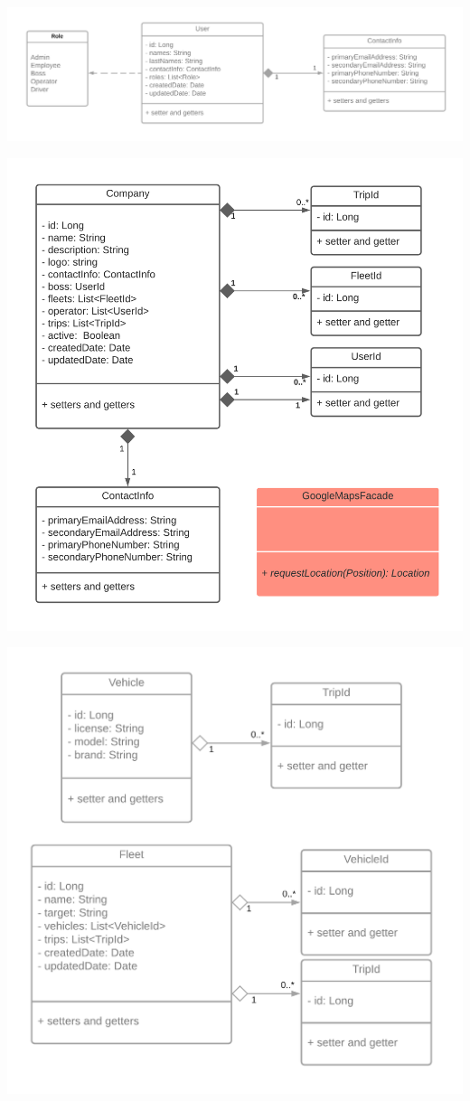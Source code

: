 \documentclass{article}
\begin{document}
\begin{center}
    \includegraphics[scale=.15]{pics/c1.png}%
\end{center}
\begin{center}
    \includegraphics[scale=.2]{pics/c2.png}%
\end{center}
\begin{center}
    \includegraphics[scale=.2]{pics/c3.png}%
\end{center}
\end{document}
